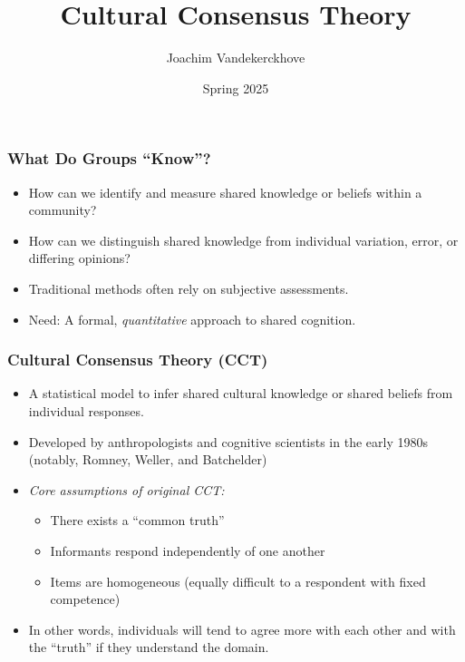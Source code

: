 \documentclass[aspectratio=169]{beamer}
\title{Cultural Consensus Theory}
\author{Joachim Vandekerckhove}
\date{Spring 2025}
\begin{document}
\maketitle


\begin{frame}
    \frametitle{What Do Groups ``Know''?}
    \begin{itemize}
        \item How can we identify and measure shared knowledge or beliefs within a community?
        \item How can we distinguish shared knowledge from individual variation, error, or differing opinions?
        \item Traditional methods often rely on subjective assessments.
        \item Need: A formal, \textit{quantitative} approach to shared cognition.
    \end{itemize}
\end{frame}


\begin{frame}
    \frametitle{Cultural Consensus Theory (CCT)}
    \begin{itemize}
        \item A statistical model to infer shared cultural knowledge or shared beliefs from individual responses.
        \item Developed by anthropologists and cognitive scientists in the early 1980s (notably, Romney, Weller, and Batchelder)
        \item \textit{Core assumptions of original CCT:} 
        \begin{itemize}
            \item There exists a ``common truth''
            \item Informants respond independently of one another
            \item Items are homogeneous (equally difficult to a respondent with fixed competence)
        \end{itemize}
        \item In other words, individuals will tend to agree more with each other and with the ``truth'' if they understand the domain.
    \end{itemize}
\end{frame}
\end{document}
